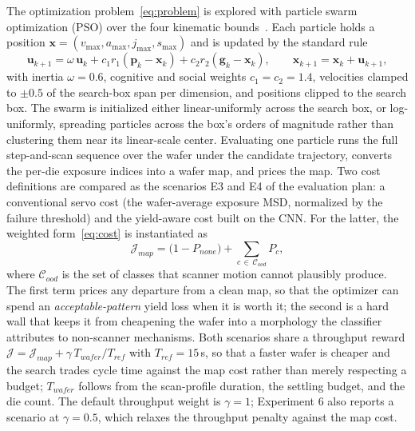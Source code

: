 The optimization problem~\eqref{eq:problem} is explored with particle swarm optimization (PSO) over the four kinematic bounds~\citep{Lin2014_PSOMinJerk, Chen2025_MetaheuristicRecipe}. Each particle holds a position $\mathbf{x} = (v_{\max}, a_{\max}, j_{\max}, s_{\max})$ and is updated by the standard rule
\begin{equation}
    \mathbf{u}_{k+1} = \omega\, \mathbf{u}_k + c_1 r_1 (\mathbf{p}_k - \mathbf{x}_k) + c_2 r_2 (\mathbf{g}_k - \mathbf{x}_k), \qquad \mathbf{x}_{k+1} = \mathbf{x}_k + \mathbf{u}_{k+1},
    \label{eq:pso}
\end{equation}
with inertia $\omega = 0.6$, cognitive and social weights $c_1 = c_2 = 1.4$, velocities clamped to $\pm 0.5$ of the search-box span per dimension, and positions clipped to the search box. The swarm is initialized either linear-uniformly across the search box, or log-uniformly, spreading particles across the box's orders of magnitude rather than clustering them near its linear-scale center. Evaluating one particle runs the full step-and-scan sequence over the wafer under the candidate trajectory, converts the per-die exposure indices into a wafer map, and prices the map. Two cost definitions are compared as the scenarios E3 and E4 of the evaluation plan: a conventional servo cost (the wafer-average exposure MSD, normalized by the failure threshold) and the yield-aware cost built on the CNN. For the latter, the weighted form~\eqref{eq:cost} is instantiated as
\begin{equation}
    \mathcal{J}_{map} = \big(1 - P_{none}\big) + \sum_{c\, \in\, \mathcal{C}_{ood}} P_c,
    \label{eq:cost_corrected}
\end{equation}
where $\mathcal{C}_{ood}$ is the set of classes that scanner motion cannot plausibly produce. The first term prices any departure from a clean map, so that the optimizer can spend an \textit{acceptable-pattern} yield loss when it is worth it; the second is a hard wall that keeps it from cheapening the wafer into a morphology the classifier attributes to non-scanner mechanisms. Both scenarios share a throughput reward $\mathcal{J} = \mathcal{J}_{map} + \gamma\, T_{wafer}/T_{ref}$ with $T_{ref} = 15$\,s, so that a faster wafer is cheaper and the search trades cycle time against the map cost rather than merely respecting a budget; $T_{wafer}$ follows from the scan-profile duration, the settling budget, and the die count. The default throughput weight is $\gamma = 1$; Experiment 6 also reports a scenario at $\gamma = 0.5$, which relaxes the throughput penalty against the map cost.

